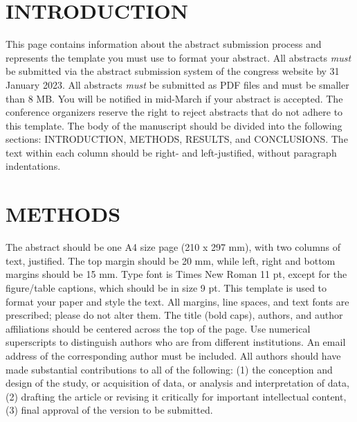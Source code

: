 \documentclass[11pt]{article}
\begin{document}
\maketitle %
\thispagestyle{empty} %

\begin{multicols}{2}
\section{INTRODUCTION}
This page contains information about the abstract submission process and represents the template you must use to format your abstract. All abstracts \emph{must} be submitted via the abstract submission system of the congress website by 31 January 2023. All abstracts \emph{must} be submitted as PDF files and must be smaller than 8 MB. You will be notified in mid-March if your abstract is accepted. The conference organizers reserve the right to reject abstracts that do not adhere to this template. 
The body of the manuscript should be divided into the following sections: INTRODUCTION, METHODS, RESULTS, and CONCLUSIONS. The text within each column should be right- and left-justified, without paragraph indentations.

\section{METHODS}
The abstract should be one A4 size page (210 x 297 mm), with two columns of text, justified. The top margin should be 20 mm, while left, right and bottom margins should be 15 mm. Type font is Times New Roman 11 pt, except for the figure/table captions, which should be in size 9 pt. This template is used to format your paper and style the text. All margins, line spaces, and text fonts are prescribed; please do not alter them.
The title (bold caps), authors, and author affiliations should be centered across the top of the page. Use numerical superscripts to distinguish authors who are from different institutions. An email address of the corresponding author must be included. All authors should have made substantial contributions to all of the following: (1) the conception and design of the study, or acquisition of data, or analysis and interpretation of data, (2) drafting the article or revising it critically for important intellectual content, (3) final approval of the version to be submitted.


\end{multicols}
\end{document}
